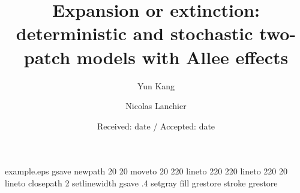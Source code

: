 \begin{filecontents*}{example.eps}
gsave
newpath
  20 20 moveto
  20 220 lineto
  220 220 lineto
  220 20 lineto
closepath
2 setlinewidth
gsave
  .4 setgray fill
grestore
stroke
grestore
\end{filecontents*}

\documentclass[smallextended]{svjour3}
\smartqed

\usepackage{graphicx}
\usepackage{amssymb}
\usepackage{amsmath}
\usepackage{theorem}
\usepackage{epsfig}
\usepackage{subfigure}
\usepackage{color}
\usepackage{newlfont}
\usepackage{multirow}
\usepackage{longtable} 
\setlength{\LTcapwidth}{6in} 
\usepackage{ifthen}
\usepackage{alltt}
\usepackage{enumerate}

 

\usepackage{lscape}
\usepackage{graphicx}
\usepackage{epstopdf}



\textwidth 6.5in
\textheight 8.5in



\title{Expansion or extinction: deterministic and stochastic two-patch models with Allee effects}

\author{Yun Kang \and Nicolas Lanchier}


\date{Received: date / Accepted: date}

\maketitle

